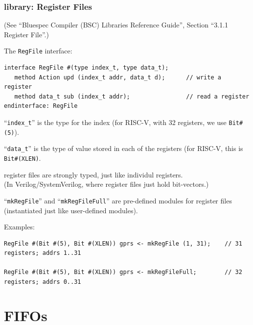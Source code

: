 
\begin{frame}[fragile]
\frametitle{{\BSV} library: Register Files}

\footnotesize

(See ``Bluespec Compiler (BSC) Libraries Reference Guide'', Section ``3.1.1 Register File''.)

\vspace{2ex}

The {\tt RegFile} interface:

\begin{Verbatim}[frame=single]
interface RegFile #(type index_t, type data_t);
   method Action upd (index_t addr, data_t d);      // write a register
   method data_t sub (index_t addr);                // read a register
endinterface: RegFile
\end{Verbatim}

``\verb|index_t|'' is the type for the index (for RISC-V, with 32
registers, we use \verb|Bit#(5)|).

``\verb|data_t|'' is the type of value stored in each of the
registers (for RISC-V, this is \verb|Bit#(XLEN)|.

\vspace{2ex}

{\BSV} register files are strongly typed, just like individul registers. \\
(In Verilog/SystemVerilog, where register files just hold bit-vectors.)

\vspace{2ex}

``{\tt mkRegFile}'' and ``{\tt mkRegFileFull}'' are pre-defined {\BSV}
modules for register files (instantiated just like user-defined
modules).

Examples:

\begin{Verbatim}[frame=single]
RegFile #(Bit #(5), Bit #(XLEN)) gprs <- mkRegFile (1, 31);    // 31 registers; addrs 1..31

RegFile #(Bit #(5), Bit #(XLEN)) gprs <- mkRegFileFull;        // 32 registers; addrs 0..31
\end{Verbatim}

\end{frame}


\section{FIFOs}

